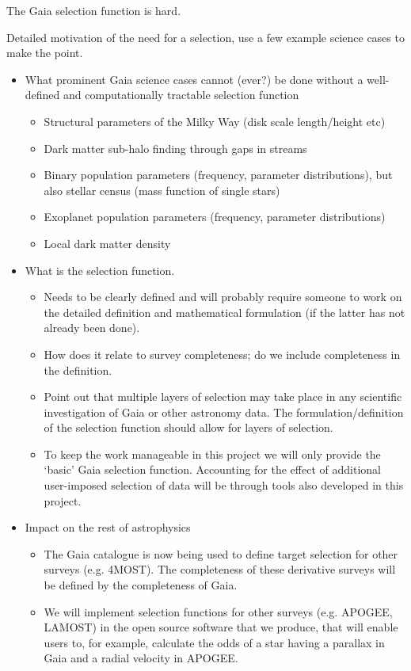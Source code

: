 The Gaia selection function is hard.



Detailed motivation of the need for a selection, use a few example science cases to make the point.

\begin{itemize}
    \item What prominent Gaia science cases cannot (ever?) be done without a well-defined and computationally tractable
        selection function
        \begin{itemize}
            \item Structural parameters of the Milky Way (disk scale length/height etc)
            \item Dark matter sub-halo finding through gaps in streams
            \item Binary population parameters (frequency, parameter distributions), but also stellar census (mass function of single stars)
            \item Exoplanet population parameters (frequency, parameter distributions)
            \item Local dark matter density
        \end{itemize}
    \item What is the selection function.
        \begin{itemize}
            \item Needs to be clearly defined and will probably require someone to work on the detailed definition and
                mathematical formulation (if the latter has not already been done).
            \item How does it relate to survey completeness; do we include completeness in the definition.
            \item Point out that multiple layers of selection may take place in any scientific investigation of Gaia or
                other astronomy data. The formulation/definition of the selection function should allow for layers of
                selection.
            \item To keep the work manageable in this project we will only provide the `basic' Gaia selection function.
                Accounting for the effect of additional user-imposed selection of data will be through tools also
                developed in this project.
        \end{itemize}
    \item Impact on the rest of astrophysics
        \begin{itemize}
            \item The Gaia catalogue is now being used to define target selection for other surveys (e.g. 4MOST). The completeness of these derivative surveys will be defined by the completeness of Gaia.
            \item We will implement selection functions for other surveys (e.g. APOGEE, LAMOST) in the open source software that we produce, that will enable users to, for example, calculate the odds of a star having a parallax in Gaia and a radial velocity in APOGEE.
        \end{itemize}
\end{itemize}

